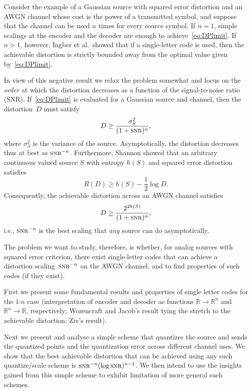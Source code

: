 \documentclass[a4paper]{article}
\theoremstyle{definition}
\newcommand{\ie}{i.e.}
\newcommand{\abbrev}[1]{\textsc{\MakeLowercase{#1}}}
\newcommand{\snr}{\abbrev{snr}}
\newcommand{\R}{\mathbb{R}}
\newcommand{\ssq}{{\sigma_S^2}}
\begin{document}
Consider the example of a Gaussian source with squared error distortion and an
AWGN channel whose cost is the power of a transmitted symbol, and suppose that
the channel can be used $n$ times for every source symbol. If $n = 1$, simple
scalings at the encoder and the decoder are enough to
achieve~\eqref{eq:DPlimit}. If $n > 1$, however, Ingber et
al.\ showed that if a single-letter code is used, then the
achievable distortion is strictly bounded away from the optimal value given
by~\eqref{eq:DPlimit}. 

In view of this negative result we relax the problem somewhat and focus on the
\emph{order} at which the distortion decreases as a function of the
signal-to-noise ratio (SNR). If~\eqref{eq:DPlimit} is evaluated for a Gaussian
source and channel, then the distortion~$D$ must satisfy
\begin{equation*}
  D \ge \frac{\ssq}{(1 + \snr)^n},
\end{equation*}
where $\ssq$ is the variance of the source. Asymptotically, the distortion
decreases thus at best as $\snr^{-n}$. Furthermore, Shannon showed that an
arbitrary continuous valued source $S$ with entropy $h(S)$ and squared error
distortion satisfies
\begin{equation*}
  R(D) \ge h(S) - \frac12 \log D.
\end{equation*}
Consequently, the achievable distortion across an AWGN channel satisfies
\begin{equation*}
  D \ge \frac{2^{2 h(S)}}{(1 + \snr)^n},
\end{equation*}
\ie, $\snr^{-n}$ is the best scaling that \emph{any} source can do
asymptotically. 

The problem we want to study, therefore, is whether, for analog sources with
squared error criterion, there exist single-letter codes that can achieve a
distortion scaling~$\snr^{-n}$ on the AWGN channel,  and to find properties of
such codes (if they exist).

First we present some fundamental results and properties of single letter codes
for the $1$:$n$ case (interpretation of encoder and decoder as functions $\R
\rightarrow \R^n$ and $\R^n \rightarrow \R$, respectively; Wozencraft and
Jacob's result tying the stretch to the achievable distortion; Ziv's result).

Next we present and analyse a simple scheme that quantizes the source and sends
the quantized points and the quantization error across different channel uses.
We show that the best achievable distortion that can be achieved using any such
quantize/scale scheme is $\snr^{-n}(\log\snr)^{n-1}$. We then intend to use the
insights gained from this simple scheme to exhibit limitation of more general
such schemes. 
\end{document}
